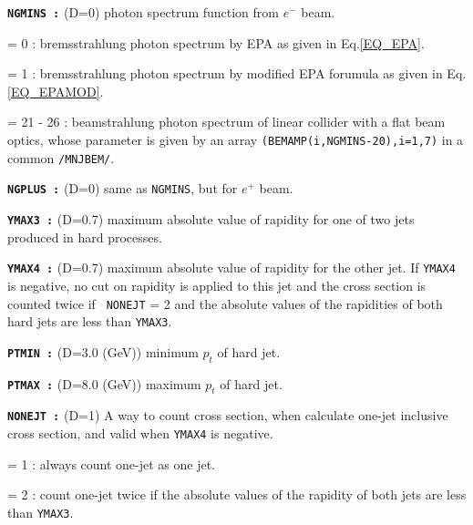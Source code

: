 \begin{list}{ }{\parsep=0pt \itemsep=0pt \topsep=0pt }
\item[\bf \tt NGMINS :] (D=0) photon spectrum function from $e^-$ beam.
  \begin{list}{}{\itemsep=0pt \parsep=0pt \topsep=0pt}
  \item[= 0 :] bremsstrahlung photon spectrum by EPA as given in 
Eq.\ref{EQ_EPA}. 
  \item[= 1 :] bremsstrahlung photon spectrum by modified EPA forumula
as given in Eq.\ref{EQ_EPAMOD}.
  \item[= 21 - 26 :] beamstrahlung photon spectrum of linear collider with
a flat beam optics, whose parameter is given by an array 
{\tt (BEMAMP(i,{\tt NGMINS-20}),i=1,7)} in a common {\tt /MNJBEM/}.
  \end{list}

\item[\bf \tt NGPLUS :] (D=0) same as {\tt NGMINS}, but for $e^+$
beam.

\item[\bf \tt YMAX3 :] (D=0.7) maximum absolute value of rapidity 
for one of two jets produced in hard processes.

\item[\bf \tt YMAX4 :] (D=0.7) maximum absolute value of rapidity 
for the other jet.  If {\tt YMAX4} is negative, no cut on rapidity is
applied to this jet and the cross section is counted twice if {\tt
NONEJT} = 2 and the absolute values of the rapidities of both hard
jets are less than {\tt YMAX3}.

\item[\bf \tt PTMIN :] (D=3.0 (GeV)) minimum $p_t$ of hard jet.

\item[\bf \tt PTMAX :] (D=8.0 (GeV)) maximum $p_t$ of hard jet.

\item[\bf \tt NONEJT :] (D=1) A way to count cross section, when
calculate one-jet inclusive cross section, and valid when {\tt YMAX4} 
is negative.
  \begin{list}{}{\itemsep=0pt \parsep=0pt \topsep=0pt}
  \item[= 1 :] always count one-jet as one jet. 
  \item[= 2 :] count one-jet twice if the absolute values of
the rapidity of both jets are less than {\tt YMAX3}.
  \end{list}

\end{list}


